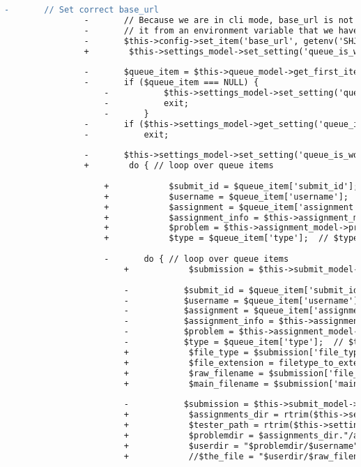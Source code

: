 \begin{lstlisting}[language=diff, caption=Perubahan pada kode Queueprocess.php]
				-		// Set correct base_url
				-		// Because we are in cli mode, base_url is not available, and we get
				-		// it from an environment variable that we have set in shj_helper.php
				-		$this->config->set_item('base_url', getenv('SHJ_BASE_URL'));
				+        $this->settings_model->set_setting('queue_is_working', '1');
				
				-		$queue_item = $this->queue_model->get_first_item();
				-		if ($queue_item === NULL) {
					-			$this->settings_model->set_setting('queue_is_working', '0');
					-			exit;
					-		}
				-		if ($this->settings_model->get_setting('queue_is_working'))
				-			exit;
				
				-		$this->settings_model->set_setting('queue_is_working', '1');
				+        do { // loop over queue items
					
					+            $submit_id = $queue_item['submit_id'];
					+            $username = $queue_item['username'];
					+            $assignment = $queue_item['assignment'];
					+            $assignment_info = $this->assignment_model->assignment_info($assignment);
					+            $problem = $this->assignment_model->problem_info($assignment, $queue_item['problem']);
					+            $type = $queue_item['type'];  // $type can be 'judge', 'rejudge', or 'exec'
					
					-		do { // loop over queue items
						+            $submission = $this->submit_model->get_submission($username, $assignment, $problem['id'], $submit_id);
						
						-			$submit_id = $queue_item['submit_id'];
						-			$username = $queue_item['username'];
						-			$assignment = $queue_item['assignment'];
						-			$assignment_info = $this->assignment_model->assignment_info($assignment);
						-			$problem = $this->assignment_model->problem_info($assignment, $queue_item['problem']);
						-			$type = $queue_item['type'];  // $type can be 'judge', 'rejudge', or 'exec'
						+            $file_type = $submission['file_type'];
						+            $file_extension = filetype_to_extension($file_type);
						+            $raw_filename = $submission['file_name'];
						+            $main_filename = $submission['main_file_name'];
						
						-			$submission = $this->submit_model->get_submission($username, $assignment, $problem['id'], $submit_id);
						+            $assignments_dir = rtrim($this->settings_model->get_setting('assignments_root'), '/');
						+            $tester_path = rtrim($this->settings_model->get_setting('tester_path'), '/');
						+            $problemdir = $assignments_dir."/assignment_$assignment/p".$problem['id'];
						+            $userdir = "$problemdir/$username";
						+            //$the_file = "$userdir/$raw_filename.$file_extension";
						

\end{lstlisting}
